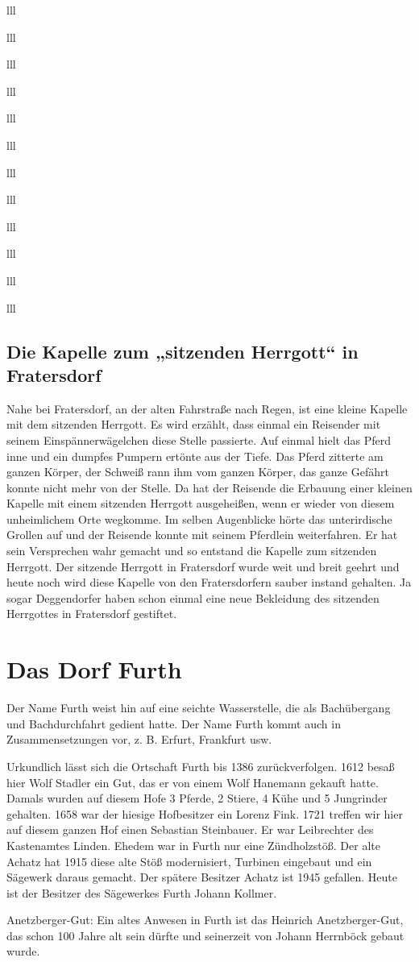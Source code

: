 \documentclass[12pt,a4pager]{book}
\begin{document}
\begin{tabuluar}{lll}
\begin{tabuluar}{lll}
\begin{tabuluar}{lll}
\begin{tabuluar}{lll}
\begin{tabuluar}{lll}
\begin{tabuluar}{lll}
\begin{tabuluar}{lll}
\begin{tabuluar}{lll}
\begin{tabuluar}{lll}
\begin{tabuluar}{lll}
\begin{tabuluar}{lll}
\begin{tabuluar}{lll}
\subsection{Die Kapelle zum „sitzenden Herrgott“ in Fratersdorf}

Nahe bei Fratersdorf, an der alten Fahrstraße nach Regen, ist eine kleine
Kapelle mit dem sitzenden Herrgott. Es wird erzählt, dass einmal ein Reisender
mit seinem Einspännerwägelchen diese Stelle passierte. Auf einmal hielt das
Pferd inne und ein dumpfes Pumpern ertönte aus der Tiefe. Das Pferd zitterte am
ganzen Körper, der Schweiß rann ihm vom ganzen Körper, das ganze Gefährt konnte
nicht mehr von der Stelle. Da hat der Reisende die Erbauung einer kleinen
Kapelle mit einem sitzenden Herrgott ausgeheißen, wenn er wieder von diesem
unheimlichem Orte wegkomme. Im selben Augenblicke hörte das unterirdische
Grollen auf und der Reisende konnte mit seinem Pferdlein weiterfahren. Er hat
sein Versprechen wahr gemacht und so entstand die Kapelle zum sitzenden
Herrgott. Der sitzende Herrgott in Fratersdorf wurde weit und breit geehrt und
heute noch wird diese Kapelle von den Fratersdorfern sauber instand gehalten. Ja
sogar Deggendorfer haben schon einmal eine neue Bekleidung des sitzenden
Herrgottes in Fratersdorf gestiftet.

\section{Das Dorf Furth}

Der Name Furth weist hin auf eine seichte Wasserstelle, die als Bachübergang und
Bachdurchfahrt gedient hatte. Der Name Furth kommt auch in Zusammensetzungen
vor, z. B. Erfurt, Frankfurt usw.

Urkundlich lässt sich die Ortschaft Furth bis 1386 zurückverfolgen. 1612 besaß
hier Wolf Stadler ein Gut, das er von einem Wolf Hanemann gekauft hatte. Damals
wurden auf diesem Hofe 3 Pferde, 2 Stiere, 4 Kühe und 5 Jungrinder gehalten.
1658 war der hiesige Hofbesitzer ein Lorenz Fink. 1721 treffen wir hier auf
diesem ganzen Hof einen Sebastian Steinbauer. Er war Leibrechter des Kastenamtes
Linden. Ehedem war in Furth nur eine Zündholzstöß. Der alte Achatz hat 1915
diese alte Stöß modernisiert, Turbinen eingebaut und ein Sägewerk daraus
gemacht. Der spätere Besitzer Achatz ist 1945 gefallen. Heute ist der Besitzer
des Sägewerkes Furth Johann Kollmer.

Anetzberger-Gut: Ein altes Anwesen in Furth ist das Heinrich Anetzberger-Gut,
das schon 100 Jahre alt sein dürfte und seinerzeit von Johann Herrnböck gebaut
wurde.


\end{tabuluar}
\end{tabuluar}
\end{tabuluar}
\end{tabuluar}
\end{tabuluar}
\end{tabuluar}
\end{tabuluar}
\end{tabuluar}
\end{tabuluar}
\end{tabuluar}
\end{tabuluar}
\end{tabuluar}
\end{document}
